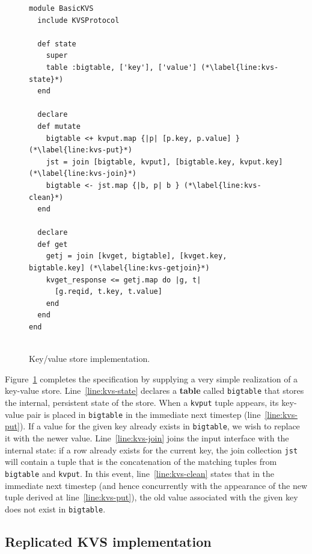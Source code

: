 \begin{figure}[t]
\begin{scriptsize}
\begin{lstlisting}
module BasicKVS
  include KVSProtocol

  def state
    super
    table :bigtable, ['key'], ['value'] (*\label{line:kvs-state}*)
  end

  declare
  def mutate
    bigtable <+ kvput.map {|p| [p.key, p.value] } (*\label{line:kvs-put}*)
    jst = join [bigtable, kvput], [bigtable.key, kvput.key] (*\label{line:kvs-join}*)
    bigtable <- jst.map {|b, p| b } (*\label{line:kvs-clean}*)
  end

  declare
  def get
    getj = join [kvget, bigtable], [kvget.key, bigtable.key] (*\label{line:kvs-getjoin}*)
    kvget_response <= getj.map do |g, t|
      [g.reqid, t.key, t.value]
    end
  end
end


\end{lstlisting}
\centering
\vspace{-10pt}
\caption{Key/value store implementation.}
\label{fig:kvs-impl}
\end{scriptsize}
\vspace{-2pt}
\end{figure}

Figure~\ref{fig:kvs-impl} completes the specification by supplying a very simple
realization of a key-value store.  Line~\ref{line:kvs-state} declares a \textbf{table}
called \texttt{bigtable} that stores the internal, persistent state of the store.
When a \texttt{kvput} tuple appears, its key-value pair is placed in \texttt{bigtable} in the
immediate next timestep (line~\ref{line:kvs-put}).  If a value for the given key already 
exists in \texttt{bigtable}, we wish to replace it with the newer value.  Line~\ref{line:kvs-join}
joins the input interface with the internal state: if a row already exists for the current key,  
the join collection \texttt{jst} will contain a tuple that is the concatenation of the matching
tuples from \texttt{bigtable} and \texttt{kvput}.  In this event, line~\ref{line:kvs-clean}
states that in the immediate next timestep (and hence concurrently with the appearance of the
new tuple derived at line~\ref{line:kvs-put}), the old value associated with the given key
does not exist in \texttt{bigtable}.  


\subsection{Replicated KVS implementation}


